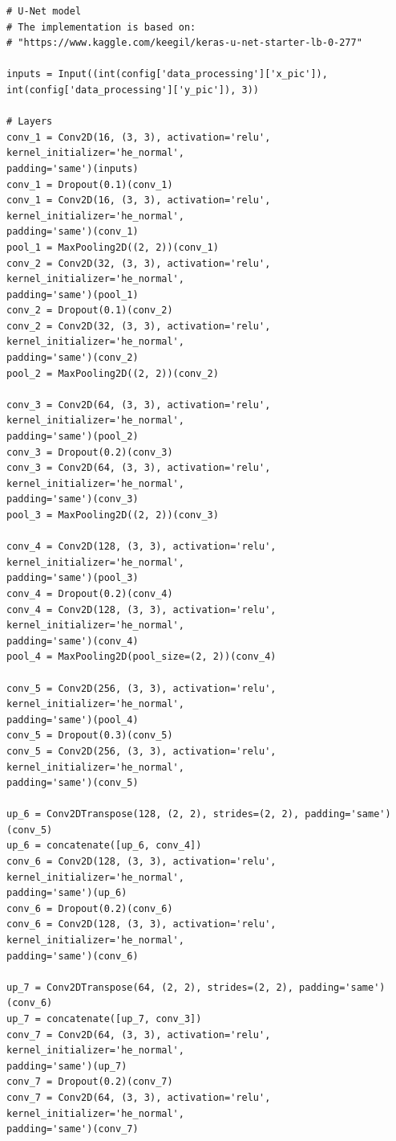\documentclass[USenglish]{ifimaster}  %
\begin{document}
\begin{verbatim}
# U-Net model
# The implementation is based on: 
# "https://www.kaggle.com/keegil/keras-u-net-starter-lb-0-277"

inputs = Input((int(config['data_processing']['x_pic']), 
int(config['data_processing']['y_pic']), 3))

# Layers
conv_1 = Conv2D(16, (3, 3), activation='relu', kernel_initializer='he_normal', 
padding='same')(inputs)
conv_1 = Dropout(0.1)(conv_1)
conv_1 = Conv2D(16, (3, 3), activation='relu', kernel_initializer='he_normal', 
padding='same')(conv_1)
pool_1 = MaxPooling2D((2, 2))(conv_1)
conv_2 = Conv2D(32, (3, 3), activation='relu', kernel_initializer='he_normal', 
padding='same')(pool_1)
conv_2 = Dropout(0.1)(conv_2)
conv_2 = Conv2D(32, (3, 3), activation='relu', kernel_initializer='he_normal',
padding='same')(conv_2)
pool_2 = MaxPooling2D((2, 2))(conv_2)

conv_3 = Conv2D(64, (3, 3), activation='relu', kernel_initializer='he_normal', 
padding='same')(pool_2)
conv_3 = Dropout(0.2)(conv_3)
conv_3 = Conv2D(64, (3, 3), activation='relu', kernel_initializer='he_normal', 
padding='same')(conv_3)
pool_3 = MaxPooling2D((2, 2))(conv_3)

conv_4 = Conv2D(128, (3, 3), activation='relu', kernel_initializer='he_normal', 
padding='same')(pool_3)
conv_4 = Dropout(0.2)(conv_4)
conv_4 = Conv2D(128, (3, 3), activation='relu', kernel_initializer='he_normal', 
padding='same')(conv_4)
pool_4 = MaxPooling2D(pool_size=(2, 2))(conv_4)

conv_5 = Conv2D(256, (3, 3), activation='relu', kernel_initializer='he_normal', 
padding='same')(pool_4)
conv_5 = Dropout(0.3)(conv_5)
conv_5 = Conv2D(256, (3, 3), activation='relu', kernel_initializer='he_normal', 
padding='same')(conv_5)

up_6 = Conv2DTranspose(128, (2, 2), strides=(2, 2), padding='same')(conv_5)
up_6 = concatenate([up_6, conv_4])
conv_6 = Conv2D(128, (3, 3), activation='relu', kernel_initializer='he_normal', 
padding='same')(up_6)
conv_6 = Dropout(0.2)(conv_6)
conv_6 = Conv2D(128, (3, 3), activation='relu', kernel_initializer='he_normal', 
padding='same')(conv_6)

up_7 = Conv2DTranspose(64, (2, 2), strides=(2, 2), padding='same') (conv_6)
up_7 = concatenate([up_7, conv_3])
conv_7 = Conv2D(64, (3, 3), activation='relu', kernel_initializer='he_normal', 
padding='same')(up_7)
conv_7 = Dropout(0.2)(conv_7)
conv_7 = Conv2D(64, (3, 3), activation='relu', kernel_initializer='he_normal', 
padding='same')(conv_7)


\end{verbatim}
\end{document}
